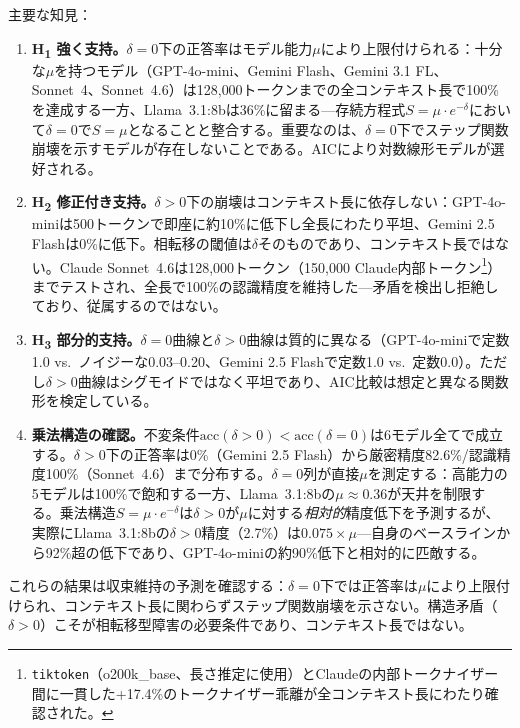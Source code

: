 \documentclass[11pt,a4paper]{article}
\begin{document}
\noindent 主要な知見：

\begin{enumerate}
  \item \textbf{H\textsubscript{1} 強く支持。}$\delta = 0$下の正答率はモデル能力$\mu$により上限付けられる：十分な$\mu$を持つモデル（GPT-4o-mini、Gemini Flash、Gemini 3.1 FL、Sonnet~4、Sonnet~4.6）は128{,}000トークンまでの全コンテキスト長で100\%を達成する一方、Llama~3.1:8bは36\%に留まる---存続方程式$S = \mu \cdot e^{-\delta}$において$\delta = 0$で$S = \mu$となることと整合する。重要なのは、$\delta = 0$下でステップ関数崩壊を示すモデルが存在しないことである。AICにより対数線形モデルが選好される。

  \item \textbf{H\textsubscript{2} 修正付き支持。}$\delta > 0$下の崩壊はコンテキスト長に依存しない：GPT-4o-miniは500トークンで即座に約10\%に低下し全長にわたり平坦、Gemini 2.5 Flashは0\%に低下。相転移の閾値は$\delta$そのものであり、コンテキスト長ではない。Claude Sonnet~4.6は128{,}000トークン（150{,}000 Claude内部トークン\footnote{\texttt{tiktoken}（o200k\_base、長さ推定に使用）とClaudeの内部トークナイザー間に一貫した+17.4\%のトークナイザー乖離が全コンテキスト長にわたり確認された。}）までテストされ、全長で100\%の認識精度を維持した---矛盾を検出し拒絶しており、従属するのではない。

  \item \textbf{H\textsubscript{3} 部分的支持。}$\delta = 0$曲線と$\delta > 0$曲線は質的に異なる（GPT-4o-miniで定数1.0 vs.\ ノイジーな0.03--0.20、Gemini 2.5 Flashで定数1.0 vs.\ 定数0.0）。ただし$\delta > 0$曲線はシグモイドではなく平坦であり、AIC比較は想定と異なる関数形を検定している。

  \item \textbf{乗法構造の確認。}不変条件$\text{acc}(\delta > 0) < \text{acc}(\delta = 0)$は6モデル全てで成立する。$\delta > 0$下の正答率は0\%（Gemini 2.5 Flash）から厳密精度82.6\%/認識精度100\%（Sonnet~4.6）まで分布する。$\delta = 0$列が直接$\mu$を測定する：高能力の5モデルは100\%で飽和する一方、Llama~3.1:8bの$\mu \approx 0.36$が天井を制限する。乗法構造$S = \mu \cdot e^{-\delta}$は$\delta > 0$が$\mu$に対する\emph{相対的}精度低下を予測するが、実際にLlama~3.1:8bの$\delta > 0$精度（2.7\%）は$0.075 \times \mu$---自身のベースラインから92\%超の低下であり、GPT-4o-miniの約90\%低下と相対的に匹敵する。
\end{enumerate}

\noindent これらの結果は収束維持の予測を確認する：$\delta = 0$下では正答率は$\mu$により上限付けられ、コンテキスト長に関わらずステップ関数崩壊を示さない。構造矛盾（$\delta > 0$）こそが相転移型障害の必要条件であり、コンテキスト長ではない。
\end{document}
